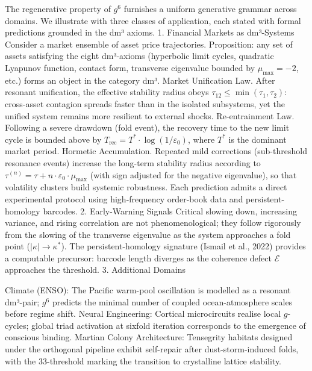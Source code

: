 The regenerative property of $  g^6  $ furnishes a uniform generative grammar across domains. We illustrate with three classes of application, each stated with formal predictions grounded in the dm³ axioms.
1. Financial Markets as dm³-Systems
Consider a market ensemble of asset price trajectories. Proposition: any set of assets satisfying the eight dm³-axioms (hyperbolic limit cycles, quadratic Lyapunov function, contact form, transverse eigenvalue bounded by $  \mu_{\max} = -2  $, etc.) forms an object in the category dm³.
Market Unification Law. After resonant unification, the effective stability radius obeys $  \tau_{12} \le \min(\tau_1, \tau_2)  $: cross-asset contagion spreads faster than in the isolated subsystems, yet the unified system remains more resilient to external shocks.
Re-entrainment Law. Following a severe drawdown (fold event), the recovery time to the new limit cycle is bounded above by $  T_{\text{rec}} = T^* \cdot \log(1/\varepsilon_0)  $, where $  T^*  $ is the dominant market period.
Hormetic Accumulation. Repeated mild corrections (sub-threshold resonance events) increase the long-term stability radius according to $  \tau^{(n)} = \tau + n \cdot \varepsilon_0 \cdot \mu_{\max}  $ (with sign adjusted for the negative eigenvalue), so that volatility clusters build systemic robustness.
Each prediction admits a direct experimental protocol using high-frequency order-book data and persistent-homology barcodes.
2. Early-Warning Signals
Critical slowing down, increasing variance, and rising correlation are not phenomenological; they follow rigorously from the slowing of the transverse eigenvalue as the system approaches a fold point ($  |\kappa| \to \kappa^*  $). The persistent-homology signature (Ismail et al., 2022) provides a computable precursor: barcode length diverges as the coherence defect $  \mathcal{E}  $ approaches the threshold.
3. Additional Domains

Climate (ENSO): The Pacific warm-pool oscillation is modelled as a resonant dm³-pair; $  g^6  $ predicts the minimal number of coupled ocean-atmosphere scales before regime shift.
Neural Engineering: Cortical microcircuits realise local $  g  $-cycles; global triad activation at sixfold iteration corresponds to the emergence of conscious binding.
Martian Colony Architecture: Tensegrity habitats designed under the orthogonal pipeline exhibit self-repair after dust-storm-induced folds, with the 33-threshold marking the transition to crystalline lattice stability.

